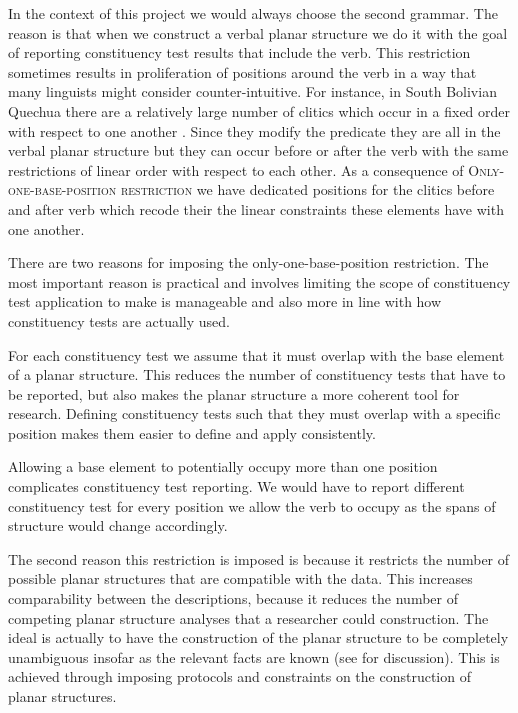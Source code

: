 \documentclass[output=paper,hidelinks]{langscibook}
\begin{document}
In the context of this project we would always choose the second grammar. The reason is that when we construct a verbal planar structure we do it with the goal of reporting constituency test results that include the verb. This restriction sometimes results in proliferation of positions around the verb in a way that many linguists might consider counter-intuitive. For instance, in South Bolivian Quechua there are a relatively large number of clitics which occur in a fixed order with respect to one another . Since they modify the predicate they are all in the verbal planar structure but they can occur before or after the verb with the same restrictions of linear order with respect to each other. As a consequence of \textsc{Only-one-base-position restriction} we have dedicated positions for the clitics before and after verb which recode their the linear constraints these elements have with one another.

There are two reasons for imposing the only-one-base-position restriction. The most important reason is practical and involves limiting the scope of constituency test application to make is manageable and also  more in line with how constituency tests are actually used. 

For each constituency test we assume that it must overlap with the base element of a planar structure. This reduces the number of constituency tests that have to be reported, but also makes the planar structure a more coherent tool for research. Defining constituency tests such that they must overlap with a specific position makes them easier to define and apply consistently. 

Allowing a base element to potentially occupy more than one position complicates constituency test reporting. We would have to report different constituency test for every position we allow the verb to occupy as the spans of structure would change accordingly.

The second reason this restriction is imposed is because it restricts the number of possible planar structures that are compatible with the data. This increases comparability between the descriptions, because it reduces the number of competing planar structure analyses that a researcher could construction. The ideal is actually to have the construction of the planar structure to be completely unambiguous insofar as the relevant facts are known (see  for discussion). This is achieved through imposing protocols and constraints on the construction of planar structures.
\end{document}

